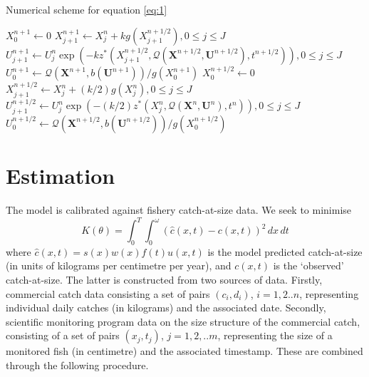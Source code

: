 \documentclass{article}
\begin{document}
\begin{algorithm}
  \caption{Numerical scheme for equation \ref{eq:1}}\label{alg:original}
  \begin{algorithmic}
    \State $X_0^{n+1} \gets 0$
    \State $X_{j+1}^{n+1} \gets X_j^n + k g(X_{j+1}^{n+1/2}), 0 \leq j \leq J$
    \State $U_{j+1}^{n+1} \gets U_j^n \exp\left(-k z^*(X_{j+1}^{n+1/2},\mathcal{Q}(\mathbf{X}^{n+1/2},\mathbf{U}^{n+1/2}),t^{n+1/2})\right), 0 \leq j \leq J$
    \State $U_0^{n+1} \gets \mathcal{Q}(\mathbf{X}^{n+1},b(\mathbf{U}^{n+1})) / g(X_{0}^{n+1})$
    \State $X_0^{n+1/2} \gets 0$
    \State $X_{j+1}^{n+1/2} \gets X_j^n + (k/2) g(X_j^n), 0 \leq j \leq J$
    \State $U_{j+1}^{n+1/2} \gets U_j^n \exp\left(-(k/2) z^*(X_j^n,\mathcal{Q}(\mathbf{X}^n,\mathbf{U}^n),t^n)\right), 0 \leq j \leq J$
    \State $U_0^{n+1/2} \gets \mathcal{Q}(\mathbf{X}^{n+1/2},b(\mathbf{U}^{n+1/2})) / g(X_{0}^{n+1/2})$
  \end{algorithmic}
\end{algorithm}


\section{Estimation}
The model is calibrated against fishery catch-at-size data. We seek to minimise
\begin{equation}
K(\theta) = \int_0^T \int_0^\omega \left(\hat{c}(x,t) - c(x,t)\right)^2 \,dx\,dt
\end{equation}
where $\hat{c}(x,t) = s(x)w(x)f(t)u(x,t)$ is the model predicted catch-at-size (in units of kilograms per centimetre per year), and $c(x,t)$ is the `observed' catch-at-size. The latter is constructed from two sources of data. Firstly, commercial catch data consisting a set of pairs $(c_i,d_i)$, $i=1,2..n$, representing individual daily catches (in kilograms) and the associated date.  Secondly, scientific monitoring program data on the size structure of the commercial catch, consisting of a set of pairs $(x_j,t_j)$, $j=1,2,..m$, representing the size of a monitored fish (in centimetre) and the associated timestamp.  These are combined through the following procedure.
\end{document}
